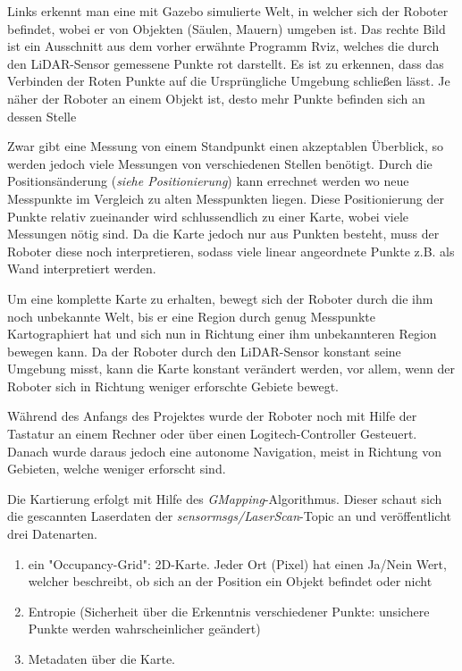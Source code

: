 {{		Links erkennt man eine mit Gazebo simulierte Welt, in welcher sich der Roboter befindet, wobei er von Objekten (Säulen, Mauern) umgeben ist. Das rechte Bild ist ein Ausschnitt aus dem vorher erwähnte Programm Rviz, welches die durch den LiDAR-Sensor gemessene Punkte rot darstellt. Es ist zu erkennen, dass das Verbinden der Roten Punkte auf die Ursprüngliche Umgebung schließen lässt. Je näher der Roboter an einem Objekt ist, desto mehr Punkte befinden sich an dessen Stelle
		
		Zwar gibt eine Messung von einem Standpunkt einen akzeptablen Überblick, so werden jedoch viele Messungen von verschiedenen Stellen benötigt. Durch die Positionsänderung (\emph{siehe Positionierung}) kann errechnet werden wo neue Messpunkte im Vergleich zu alten Messpunkten liegen. Diese Positionierung der Punkte relativ zueinander wird schlussendlich zu einer Karte, wobei viele Messungen nötig sind. Da die Karte jedoch nur aus Punkten besteht, muss der Roboter diese noch interpretieren, sodass viele linear angeordnete Punkte z.B. als Wand interpretiert werden.
		
		Um eine komplette Karte zu erhalten, bewegt sich der Roboter durch die ihm noch unbekannte Welt, bis er eine Region durch genug Messpunkte Kartographiert hat und sich nun in Richtung einer ihm unbekannteren Region bewegen kann. Da der Roboter durch den LiDAR-Sensor konstant seine Umgebung misst, kann die Karte konstant verändert werden, vor allem, wenn der Roboter sich in Richtung weniger erforschte Gebiete bewegt.
		
		Während des Anfangs des Projektes wurde der Roboter noch mit Hilfe der Tastatur an einem Rechner oder über einen Logitech-Controller Gesteuert. Danach wurde daraus jedoch eine autonome Navigation, meist in Richtung von Gebieten, welche weniger erforscht sind. 
		
		Die Kartierung erfolgt mit Hilfe des \emph{GMapping}-Algorithmus. Dieser schaut sich die gescannten Laserdaten der \emph{sensor\textunderscore msgs/LaserScan}-Topic an und veröffentlicht drei Datenarten.
		\begin{enumerate}
			\item ein "Occupancy-Grid": 2D-Karte. Jeder Ort (Pixel) hat einen Ja/Nein Wert, welcher beschreibt, ob sich an der Position ein Objekt befindet oder nicht
			\item Entropie (Sicherheit über die Erkenntnis verschiedener Punkte: unsichere Punkte werden wahrscheinlicher geändert)
			\item Metadaten über die Karte.
		\end{enumerate}
		
}}
